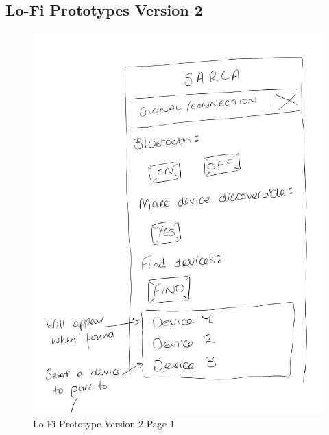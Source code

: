 \documentclass{ueacmpstyle}
\begin{document}
            \subsection{Lo-Fi Prototypes Version 2}
            \begin{figure}[h]
                
                \includegraphics[width=\linewidth]{Images/Lofi_v2_a.jpg}
                \caption{Lo-Fi Prototype Version 2 Page 1}
                \label{Figure Lofi v2 1}
            
            \end{figure}
            \clearpage
            
\end{document}

